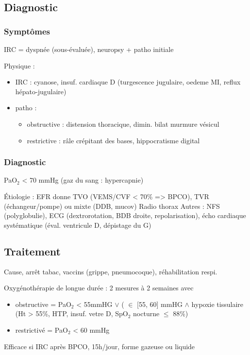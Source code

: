 \documentclass{article}
\begin{document}
\subsection{Diagnostic}
\label{sec:orgf8776e2}
\subsubsection{Symptômes}
\label{sec:org35a8cf3}
IRC = dyspnée (sous-évaluée), neuropsy + patho initiale

Physique : 
\begin{itemize}
\item IRC : cyanose, insuf. cardiaque D (turgescence jugulaire, oedeme MI, reflux
hépato-jugulaire)
\item patho : 
\begin{itemize}
\item obstructive : distension thoracique, dimin. bilat murmure vésicul
\item restrictive : râle crépitant des bases, hippocratisme digital
\end{itemize}
\end{itemize}

\subsubsection{Diagnostic}
\label{sec:org7599c0f}
PaO\(_{\text{2}}\) < 70 mmHg (gaz du sang : hypercapnie)

Étiologie : EFR donne TVO (VEMS/CVF < 70\% => BPCO), TVR (échangeur/pompe) ou
mixte (DDB, mucov)
Radio thorax
Autres : NFS (polyglobulie), ECG (dextrorotation, BDB droite, repolarisation),
écho cardiaque systématique (éval. ventricule D, dépistage du G)

\subsection{Traitement}
\label{sec:org870a2d5}
Cause, arrêt tabac, vaccins (grippe, pneumocoque), réhabilitation respi.

Oxygénothérapie de longue durée : 2 mesures à 2 semaines avec
\begin{itemize}
\item obstructive = PaO\(_{\text{2}}\) < 55mmHG \(\vee\) ( \(\in\) [55, 60] mmHG \(\wedge\) hypoxie
tissulaire (Ht > 55\%, HTP, insuf. vetre D, SpO\(_{\text{2}}\) nocturne \(\le\) 88\%)
\item restrictivé = PaO\(_{\text{2}}\) < 60 mmHg
\end{itemize}
Efficace si  IRC après BPCO, 15h/jour, forme gazeuse ou liquide
\end{document}
